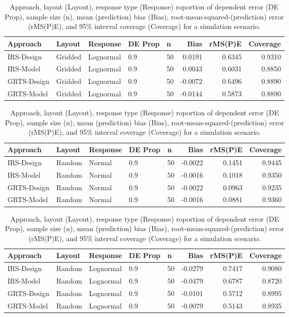 \documentclass[]{elsarticle} %
\begin{document}
\begin{table}[ht]
\centering
\begin{tabular}{lllllrrr}
  \hline
Approach & Layout & Response & DE Prop & n & Bias & rMS(P)E & Coverage \\ 
  \hline
IRS-Design & Gridded & Lognormal & 0.9 & 50 & 0.0191 & 0.6345 & 0.9310 \\ 
  IRS-Model & Gridded & Lognormal & 0.9 & 50 & 0.0043 & 0.6031 & 0.8850 \\ 
  GRTS-Design & Gridded & Lognormal & 0.9 & 50 & -0.0072 & 0.6496 & 0.8890 \\ 
  GRTS-Model & Gridded & Lognormal & 0.9 & 50 & -0.0144 & 0.5873 & 0.8890 \\ 
   \hline
\end{tabular}
\caption{Approach, layout (Layout), response type (Response) roportion of dependent error (DE Prop), sample size (n), mean (prediction) bias (Bias), root-mean-squared-(prediction) error (rMS(P)E), and 95\% interval coverage (Coverage) for a simulation scenario.} 
\end{table}
\begin{table}[ht]
\centering
\begin{tabular}{lllllrrr}
  \hline
Approach & Layout & Response & DE Prop & n & Bias & rMS(P)E & Coverage \\ 
  \hline
IRS-Design & Random & Normal & 0.9 & 50 & -0.0022 & 0.1451 & 0.9445 \\ 
  IRS-Model & Random & Normal & 0.9 & 50 & -0.0016 & 0.1018 & 0.9350 \\ 
  GRTS-Design & Random & Normal & 0.9 & 50 & -0.0022 & 0.0963 & 0.9235 \\ 
  GRTS-Model & Random & Normal & 0.9 & 50 & -0.0016 & 0.0881 & 0.9360 \\ 
   \hline
\end{tabular}
\caption{Approach, layout (Layout), response type (Response) roportion of dependent error (DE Prop), sample size (n), mean (prediction) bias (Bias), root-mean-squared-(prediction) error (rMS(P)E), and 95\% interval coverage (Coverage) for a simulation scenario.} 
\end{table}
\begin{table}[ht]
\centering
\begin{tabular}{lllllrrr}
  \hline
Approach & Layout & Response & DE Prop & n & Bias & rMS(P)E & Coverage \\ 
  \hline
IRS-Design & Random & Lognormal & 0.9 & 50 & -0.0279 & 0.7417 & 0.9080 \\ 
  IRS-Model & Random & Lognormal & 0.9 & 50 & -0.0479 & 0.6787 & 0.8720 \\ 
  GRTS-Design & Random & Lognormal & 0.9 & 50 & -0.0101 & 0.5712 & 0.8995 \\ 
  GRTS-Model & Random & Lognormal & 0.9 & 50 & -0.0079 & 0.5143 & 0.8935 \\ 
   \hline
\end{tabular}
\caption{Approach, layout (Layout), response type (Response) roportion of dependent error (DE Prop), sample size (n), mean (prediction) bias (Bias), root-mean-squared-(prediction) error (rMS(P)E), and 95\% interval coverage (Coverage) for a simulation scenario.} 
\end{table}
\end{document}
